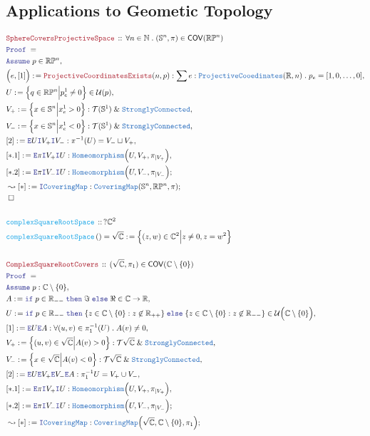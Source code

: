 \documentclass[12pt]{scrartcl}
\newcommand{\TYPE}[1]{\textcolor{NavyBlue}{\mathtt{#1}}}
\newcommand{\FUNC}[1]{\textcolor{Cerulean}{\mathtt{#1}}}
\newcommand{\LOGIC}[1]{\textcolor{Blue}{\mathtt{#1}}}
\newcommand{\THM}[1]{\textcolor{Maroon}{\mathtt{#1}}}
\renewcommand{\.}{\; . \;}
\newcommand{\de}{: \kern 0.1pc =}
\newcommand{\If}{\LOGIC{if} \;}
\newcommand{\Then}{ \; \LOGIC{then} \;}
\newcommand{\Else}{\; \LOGIC{else} \;}
\newcommand{\Act}[1]{\left( #1 \right)}
\newcommand{\Theorem}[2]{& \THM{#1} \, :: \, #2 \\ & \Proof = \\ }
\newcommand{\DeclareFunc}[2]{& \FUNC{#1} \, :: \, #2 \\}
\newcommand{\DefineNamedFunc}[4]{&  \FUNC{#1}\Act{#2} = #3 \de #4 \\}
\newcommand{\Page}[1]{ \begin{align*} #1 \end{align*}   }
\renewcommand{\And}{\; \& \;}
\newcommand{\Intro}{\LOGIC{I}}
\newcommand{\Elim}{\LOGIC{E}}
\newcommand{\Reals}{\mathbb{R} }
\newcommand{\Complex}{\mathbb{C}}
\newcommand{\Sphere}{\mathbb{S}}
\newcommand{\Nat}{\mathbb{N} }
\newcommand{\Say}[3]{& #1 \de #2 : #3, \\}
\newcommand{\SayIn}[3]{& #1 \de #2 \in #3, \\}
\newcommand{\Conclude}[3]{& #1 \de #2 : #3; \\}
\newcommand{\DeriveConclude}[3]{& \leadsto #1 \de #2 : #3 ; \\}
\newcommand{\Assume}[2]{& \LOGIC{Assume} \; #1 : #2, \\}
\newcommand{\AssumeIn}[2]{& \LOGIC{Assume} \; #1 \in #2, \\}
\newcommand{\QED}{\; \square}
\newcommand{\EndProof}{& \QED \\}
\newcommand{\Proof}{\LOGIC{Proof} \; }
\newcommand{\T}{\mathcal{T}}
\newcommand{\U}{\mathcal{U}}
\renewcommand{\P}{\mathbb{P}}
\newcommand{\COV}{\mathsf{COV}}
\begin{document}
\subsection{Applications to Geometic Topology}
\Page{
	\Theorem{SphereCoversProjectiveSpace}
	{
		\forall n \in \Nat \. 
		(\Sphere^n,\pi) \in \COV(\Reals \P^n)
	}
	\AssumeIn{p}{\Reals \P^n}
	\Say{\Big(e,[1]\Big)}{\THM{ProjectiveCoordinatesExists}(n,p)}
	{
		\sum e : \TYPE{ProjectiveCooedinates}(\Reals,n) \. 
		p_e = [1,0,\ldots,0]
	}
	\SayIn{U}{ \Big\{ q \in \Reals\P^n \Big| p_e^1 \neq 0 \Big\}  }
	{
		\U(p)
	}
	\Say{V_+}{\Big\{ x \in \Sphere^n \Big| x_e^1 > 0 \Big\}}{\T(\Sphere^1) \And \TYPE{StronglyConnected}}
	\Say{V_-}{\Big\{ x \in \Sphere^n \Big| x_e^1 < 0 \Big\}}{\T(\Sphere^1) \And \TYPE{StronglyConnected}}
	\Say{[2]}{\Elim U\Intro V_+ \Intro V_-}{\pi^{-1}(U) = V_- \sqcup V_+}
	\Say{[*.1]}{\Elim \pi \Intro V_+ \Intro U}{\TYPE{Homeomorphism}\Big( U, V_+, \pi_{|V_+} \Big)}
	\Conclude{[*.2]}{\Elim \pi \Intro V_- \Intro U}{\TYPE{Homeomorphism}\Big( U, V_-, \pi_{|V_-} \Big)}
	\DeriveConclude{[*]}{\Intro \TYPE{CoveringMap}}{\TYPE{CoveringMap}(\Sphere^n,\Reals \P^n,\pi)} 
	\EndProof
	\\
	\DeclareFunc{complexSquareRootSpace}{ ?\Complex^2 }
	\DefineNamedFunc{complexSquareRootSpace}{}{\sqrt{\Complex}}
	{
		\Big\{ (z,w) \in \Complex^2 \Big| z \neq 0, z = w^2\Big\}
	}
	\\
	\Theorem{ComplexSquareRootCovers}
	{
		(\sqrt{\Complex},\pi_1) \in \COV(\Complex \setminus \{0\})
	}
	\Assume{p}{\Complex \setminus \{0\}}
	\SayIn{A}{\If p \in \Reals_{--} \Then \Im \Else \Re}{\Complex \to \Reals}
	\SayIn{U}
	{
		\If p \in \Reals_{--} 
		\Then
			\{
				z \in \Complex \setminus \{0\} : z \not \in \Reals_{++}
			\}
		\Else
			\{
				z \in \Complex \setminus \{0\} : z \not \in \Reals_{--}
			\}
	}
	{
		\U\Big(\Complex \setminus \{0\}\Big)
	}
	\Say{[1]}{\Elim U \Elim A}{ 
		\forall (u,v) \in \pi^{-1}_1 (U) \. 
		A(v) \neq 0
	}
	\Say{V_+}{\Big\{ (u,v) \in \sqrt{\Complex} \Big| A(v) > 0 \Big\}}{\T\sqrt{\Complex} \And \TYPE{StronglyConnected}}
	\Say{V_-}{\Big\{ x \in \sqrt{\Complex} \Big| A(v) < 0 \Big\}}{\T{\sqrt{\Complex}} \And \TYPE{StronglyConnected}}
	\Say{[2]}{\Elim U \Elim V_+ \Elim V_- \Elim A}
	{
			\pi^{-1}_1 U = V_+ \cup V_-
	}
	\Say{[*.1]}{\Elim \pi \Intro V_+ \Intro U}{\TYPE{Homeomorphism}\Big( U, V_+, \pi_{|V_+} \Big)}
	\Conclude{[*.2]}{\Elim \pi \Intro V_- \Intro U}{\TYPE{Homeomorphism}\Big( U, V_-, \pi_{|V_-} \Big)}
	\DeriveConclude{[*]}{\Intro \TYPE{CoveringMap}}{\TYPE{CoveringMap}\Big(\sqrt{\Complex},\Complex \setminus \{0\},\pi_1\Big)} 
}
\end{document}
